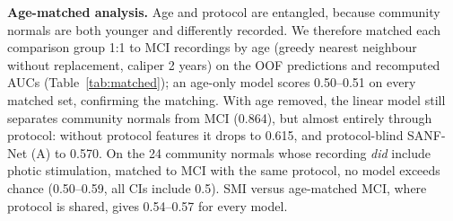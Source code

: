 \documentclass[conference]{IEEEtran}
\begin{document}
\begin{table}[t]
\centering
\caption{Protocol confound (5-fold CV out-of-fold, $n=1069$). Comm.: community-recruited normals
($n=229$); SMI: subjective memory impairment ($n=171$). LR rows: mean over 5 fold assignments.}
\label{tab:confound}
\end{table}

\textbf{Age-matched analysis.} Age and protocol are entangled, because community normals are both
younger and differently recorded. We therefore matched each comparison group 1:1 to MCI recordings by
age (greedy nearest neighbour without replacement, caliper 2 years) on the OOF predictions and
recomputed AUCs (Table~\ref{tab:matched}); an age-only model scores 0.50--0.51 on every matched set,
confirming the matching. With age removed, the linear model still separates community normals from
MCI (0.864), but almost entirely through protocol: without protocol features it drops to 0.615, and
protocol-blind SANF-Net (A) to 0.570. On the 24 community normals whose recording \emph{did} include
photic stimulation, matched to MCI with the same protocol, no model exceeds chance (0.50--0.59, all
CIs include 0.5). SMI versus age-matched MCI, where protocol is shared, gives 0.54--0.57 for every
model.
\end{document}
